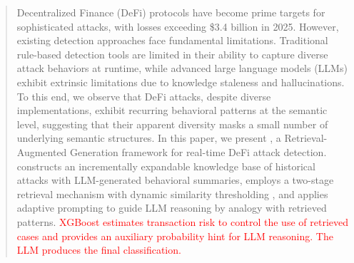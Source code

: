 
\begin{abstract}
Decentralized Finance (DeFi) protocols have become prime targets for sophisticated attacks, with losses exceeding \$3.4 billion in 2025. However, existing detection approaches face fundamental limitations. Traditional rule-based detection tools are limited in their ability to capture diverse attack behaviors at runtime, while advanced large language models (LLMs) exhibit extrinsic limitations due to knowledge staleness and hallucinations. To this end, we observe that DeFi attacks, despite diverse implementations, exhibit recurring behavioral patterns at the semantic level, suggesting that their apparent diversity masks a small number of underlying semantic structures. In this paper, we present \approach, a Retrieval-Augmented Generation framework for real-time DeFi attack detection. \approach constructs an incrementally expandable knowledge base of historical attacks with LLM-generated behavioral summaries, employs a two-stage retrieval mechanism with dynamic similarity thresholding , and applies adaptive prompting to guide LLM reasoning by analogy with retrieved patterns. \textcolor{red}{XGBoost estimates transaction risk to control the use of retrieved cases and provides an auxiliary probability hint for LLM reasoning. The LLM produces the final classification.}

\end{abstract}
